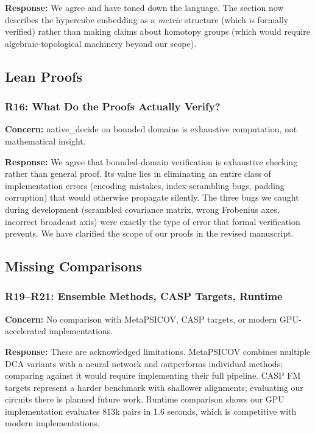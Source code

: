 \textbf{Response:} We agree and have toned down the language.  The section
now describes the hypercube embedding as a \emph{metric} structure (which is
formally verified) rather than making claims about homotopy groups (which
would require algebraic-topological machinery beyond our scope).

\subsection{Lean Proofs}

\subsubsection{R16: What Do the Proofs Actually Verify?}
\textbf{Concern:} native\_decide on bounded domains is exhaustive computation,
not mathematical insight.

\textbf{Response:} We agree that bounded-domain verification is exhaustive
checking rather than general proof.  Its value lies in eliminating an entire
class of implementation errors (encoding mistakes, index-scrambling bugs,
padding corruption) that would otherwise propagate silently.  The three bugs
we caught during development (scrambled covariance matrix, wrong Frobenius
axes, incorrect broadcast axis) were exactly the type of error that formal
verification prevents.  We have clarified the scope of our proofs in the
revised manuscript.

\subsection{Missing Comparisons}

\subsubsection{R19--R21: Ensemble Methods, CASP Targets, Runtime}
\textbf{Concern:} No comparison with MetaPSICOV, CASP targets, or modern
GPU-accelerated implementations.

\textbf{Response:} These are acknowledged limitations.  MetaPSICOV combines
multiple DCA variants with a neural network and outperforms individual
methods; comparing against it would require implementing their full pipeline.
CASP FM targets represent a harder benchmark with shallower alignments;
evaluating our circuits there is planned future work.  Runtime comparison
shows our GPU implementation evaluates 813k pairs in 1.6 seconds, which is
competitive with modern implementations.
